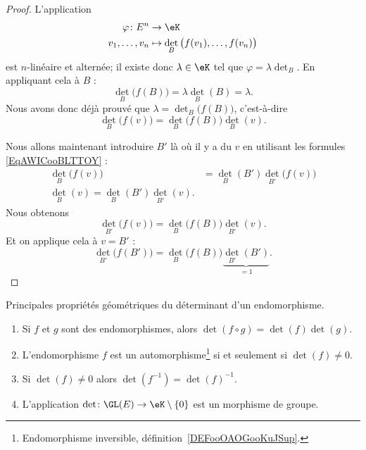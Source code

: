 \begin{proof}
	L'application
	\begin{equation}
		\begin{aligned}
			\varphi\colon E^n & \to \eK                                         \\
			v_1,\ldots, v_n   & \mapsto \det_B\big( f(v_1),\ldots, f(v_n) \big)
		\end{aligned}
	\end{equation}
	est \( n\)-linéaire et alternée; il existe donc \( \lambda\in \eK\) tel que \( \varphi=\lambda\det_B\). En appliquant cela à \( B\) :
	\begin{equation}
		\det_B\big( f(B) \big)=\lambda \det_B(B)=\lambda.
	\end{equation}
	Nous avons donc déjà prouvé que \( \lambda=\det_B\big( f(B) \big)\), c'est-à-dire
	\begin{equation}
		\det_B\big( f(v) \big)=\det_B\big( f(B) \big)\det_B(v).
	\end{equation}

	Nous allons maintenant introduire \( B'\) là où il y a du \( v\) en utilisant les formules \eqref{EqAWICooBLTTOY} :
	\begin{subequations}
		\begin{align}
			\det_B\big( f(v) \big) & =\det_B(B')\det_{B'}\big( f(v) \big) \\
			\det_B(v)=\det_B(B')\det_{B'}(v).
		\end{align}
	\end{subequations}
	Nous obtenons
	\begin{equation}
		\det_{B'}\big( f(v) \big)=\det_B\big( f(B) \big)\det_{B'}(v).
	\end{equation}
	Et on applique cela à \( v=B'\) :
	\begin{equation}
		\det_{B'}\big( f(B') \big)=\det_B\big( f(B) \big)\underbrace{\det_{B'}(B')}_{=1}.
	\end{equation}
\end{proof}

\begin{proposition}     \label{PropYQNMooZjlYlA}
	Principales propriétés géométriques du déterminant d'un endomorphisme.
	\begin{enumerate}
		\item   \label{ItemUPLNooYZMRJy}
		      Si \( f\) et \( g\)  sont des endomorphismes, alors \( \det(f\circ g)=\det(f)\det(g)\).
		\item       \label{ITEMooNZNLooODdXeH}
		      L'endomorphisme \( f\) est un automorphisme\footnote{Endomorphisme inversible, définition~\ref{DEFooOAOGooKuJSup}.} si et seulement si \( \det(f)\neq 0\).
		\item   \label{ITEMooZMVXooLGjvCy}
		      Si \( \det(f)\neq 0\) alors \( \det(f^{-1})=\det(f)^{-1}\).
		\item       \label{ItemooPJVYooYSwqaE}
		      L'application \( \det\colon \GL(E)\to \eK\setminus\{ 0 \}\) est un morphisme de groupe.
	\end{enumerate}
\end{proposition}

